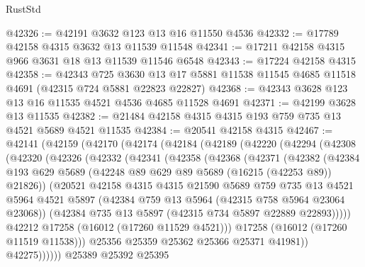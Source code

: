 \begin{lexlean}{RustStd}
\begin{coremodule}
@42326 := @42191 @3632 @123 @13 @16 @11550 @4536
@42332 := @17789 @42158 @4315 @3632 @13 @11539 @11548
@42341 := @17211 @42158 @4315 @966 @3631 @18 @13 @11539 @11546 @6548
@42343 := @17224 @42158 @4315
@42358 := @42343
    @725
    @3630
    @13
    @17
    @5881
    @11538
    @11545
    @4685
    @11518
    @4691
    (@42315 @724 @5881 @22823 @22827)
@42368 := @42343 @3628 @123 @13 @16 @11535 @4521 @4536 @4685 @11528 @4691
@42371 := @42199 @3628 @13 @11535
@42382 := @21484 @42158 @4315 @4315 @193 @759 @735 @13 @4521 @5689 @4521 @11535
@42384 := @20541 @42158 @4315
@42467 := @42141
    (@42159
      (@42170
        (@42174
          (@42184
            (@42189
              (@42220
                (@42294
                  (@42308
                    (@42320
                      (@42326
                        (@42332
                          (@42341
                            (@42358
                              (@42368
                                (@42371
                                  (@42382
                                    (@42384
                                      @193
                                      @629
                                      @5689
                                      (@42248 @89 @629 @89 @5689 (@16215 (@42253 @89)) @21826))
                                    (@20521
                                      @42158
                                      @4315
                                      @4315
                                      @21590
                                      @5689
                                      @759
                                      @735
                                      @13
                                      @4521
                                      @5964
                                      @4521
                                      @5897
                                      (@42384 @759 @13 @5964 (@42315 @758 @5964 @23064 @23068))
                                      (@42384 @735 @13 @5897 (@42315 @734 @5897 @22889 @22893)))))
                                @42212
                                @17258
                                (@16012 (@17260 @11529 @4521)))
                              @17258
                              (@16012 (@17260 @11519 @11538)))
                            @25356
                            @25359
                            @25362
                            @25366
                            @25371
                            @41981))
                        @42275))))))
            @25389
            @25392
            @25395

\end{coremodule}
\end{lexlean}
